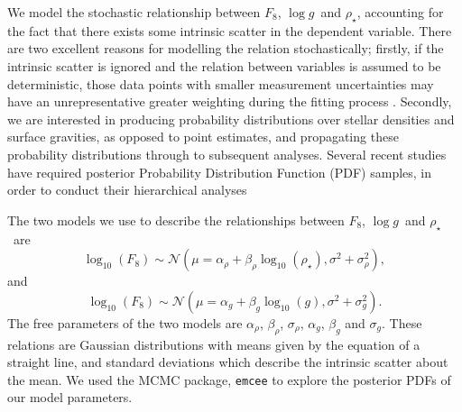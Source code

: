 \documentclass[apjl]{emulateapj}
\newcommand{\logg}{$\log g$}
\newcommand{\rhostar}{$\rho_{\star}$}
\begin{document}
We model the stochastic relationship between $F_8$, \logg\ and \rhostar,
accounting for the fact that there exists some intrinsic scatter in
the dependent variable.
There are two excellent reasons for modelling the relation stochastically;
firstly, if the intrinsic scatter is ignored and the relation between
variables is assumed to be deterministic, those data points with smaller
measurement uncertainties may have an unrepresentative greater weighting
during the fitting process \citep{hogg:2010b}.
Secondly, we are interested in producing probability distributions over
stellar densities and surface gravities, as opposed to point estimates, and
propagating these probability distributions through to subsequent analyses.
Several recent studies have required posterior Probability Distribution
Function (PDF) samples, in order to conduct their hierarchical analyses
\citep[e.g.][]{foreman-mackey:2014, rogers:2015, angus:2015}


The two models we use to describe the relationships between $F_8$, \logg\ and
\rhostar\ are
\begin{equation}
	\log_{10}(F_8) \sim \mathcal{N} \left(\mu = \alpha_\rho +
    \beta_\rho \log_{10}(\rho_\star), \sigma^2 + \sigma_\rho^2 \right),
\end{equation}
\label{eq:rho}
and
\begin{equation}
	\log_{10}(F_8) \sim \mathcal{N} \left(\mu = \alpha_g + \beta_g
    \log_{10}(g), \sigma^2 + \sigma_g^2 \right).
\end{equation}
\label{eq:logg}
The free parameters of the two models are $\alpha_\rho$, $\beta_\rho$,
$\sigma_\rho$, $\alpha_g$, $\beta_g$ and $\sigma_g$.
These relations are Gaussian distributions with means given by the equation of
a straight line, and standard deviations which describe the intrinsic scatter
about the mean.
We used the MCMC package, {\tt emcee} \citep{foreman-mackey:2013} to explore the
posterior PDFs of our model parameters.
\end{document}
